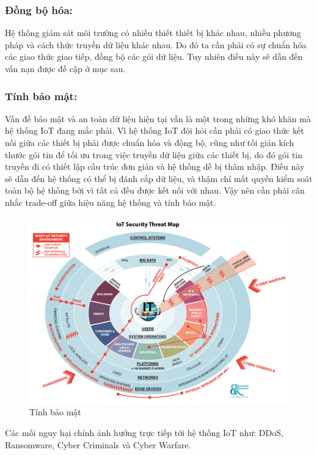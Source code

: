 \subsubsection*{Đồng bộ hóa:} Hệ thống giám sát môi trường có nhiều thiết thiết bị khác nhau, nhiều phương pháp và cách thức truyền dữ liệu khác nhau. Do đó ta cần phải có sự chuẩn hóa các giao thức giao tiếp, đồng bộ các gói dữ liệu. Tuy nhiên điều này sẽ dẫn đến vấn nạn được đề cập ở mục sau.

\subsubsection*{Tính bảo mật:} Vấn đề bảo mật và an toàn dữ liệu hiện tại vẫn là một trong những khó khăn mà hệ thống IoT đang mắc phải. Vì hệ thống IoT đòi hỏi cần phải có giao thức kết nối giữa các thiết bị phải được chuẩn hóa và động bộ, cũng như tối giản kích thước gói tin để tối ưu trong việc truyền dữ liệu giữa các thiết bị, do đó gói tin truyền đi có thiết lập cấu trúc đơn giản và hệ thống dễ bị thâm nhập. Điều này sẽ dẫn đến hệ thống có thể bị đánh cắp dữ liệu, và thậm chí mất quyền kiểm soát toàn bộ hệ thống bởi vì tất cả đều được kết nối với nhau. Vậy nên cần phải cân nhắc trade-off giữa hiệu năng hệ thống và tính bảo mật.
\begin{figure}[H]
\centering    
\includegraphics[width=5in]{virusiot}
\caption[Tính bảo mật]{Tính bảo mật}
\label{fig:virusiot}
\end{figure}

Các mối nguy hại chính ảnh hưởng trực tiếp tới hệ thống IoT như: DDoS, Ransomware, Cyber Criminals và Cyber Warfare. 



